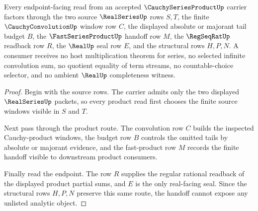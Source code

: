 \begin{theorem}
\label{thm:cauchy-series-product-realseries-handoff}
Every endpoint-facing read from an accepted $\CauchySeriesProductUp$ carrier factors through the two source $\RealSeriesUp$ rows $S,T$, the finite $\CauchyConvolutionUp$ window row $C$, the displayed absolute or majorant tail budget $B$, the $\FastSeriesProductUp$ handoff row $M$, the $\RegSeqRatUp$ readback row $R$, the $\RealUp$ seal row $E$, and the structural rows $H,P,N$. A consumer receives no host multiplication theorem for series, no selected infinite convolution sum, no quotient equality of term streams, no countable-choice selector, and no ambient $\RealUp$ completeness witness.
\end{theorem}
\begin{proof}
Begin with the source rows. The carrier admits only the two displayed $\RealSeriesUp$ packets, so every product read first chooses the finite source windows visible in $S$ and $T$.

Next pass through the product route. The convolution row $C$ builds the inspected Cauchy-product windows, the budget row $B$ controls the omitted tails by absolute or majorant evidence, and the fast-product row $M$ records the finite handoff visible to downstream product consumers.

Finally read the endpoint. The row $R$ supplies the regular rational readback of the displayed product partial sums, and $E$ is the only real-facing seal. Since the structural rows $H,P,N$ preserve this same route, the handoff cannot expose any unlisted analytic object.
\end{proof}


\begin{closurestatus}{\CauchySeriesProductUp}
  \theoryclosure{\seedClosure}
  \formalstatus{\unformalizedV}
\end{closurestatus}
